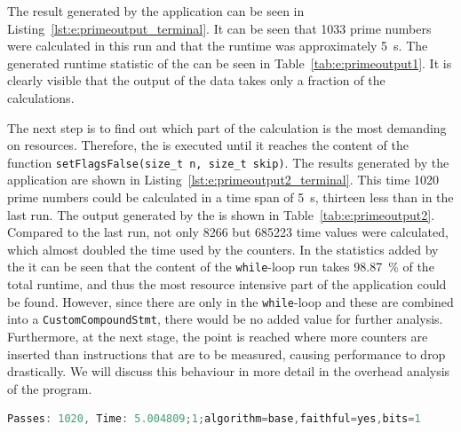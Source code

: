 The result generated by the \PRIME application can be seen in Listing~\ref{lst:e:primeoutput_terminal}. It can be seen that 1033 prime numbers were calculated in this run and that the runtime was approximately \SI{5}{\second}. The generated runtime statistic of the \TOOL can be seen in Table~\ref{tab:e:primeoutput1}. It is clearly visible that the output of the data takes only a fraction of the calculations. 

The next step is to find out which part of the calculation is the most demanding on resources. Therefore, the \TOOL is executed until it reaches the content of the function \lstinline{setFlagsFalse(size_t n, size_t skip)}. The results generated by the \PRIME application are shown in Listing~\ref{lst:e:primeoutput2_terminal}. This time 1020 prime numbers could be calculated in a time span of \SI{5}{\second}, thirteen less than in the last run. The output generated by the \TOOL is shown in Table~\ref{tab:e:primeoutput2}. Compared to the last run, not only 8266 but 685223 time values were calculated, which almost doubled the time used by the counters. In the statistics added by the \TOOL it can be seen that the content of the \lstinline{while}-loop run takes \SI{98.87}{\percent} of the total runtime, and thus the most resource intensive part of the application could be found. However, since there are only \LEASTAS in the \lstinline{while}-loop and these are combined into a \lstinline{CustomCompoundStmt}, there would be no added value for further analysis. Furthermore, at the next stage, the point is reached where more counters are inserted than instructions that are to be measured, causing performance to drop drastically. We will discuss this behaviour in more detail in the overhead analysis of the \PRIME program. 

\begin{lstlisting}[float, language=C++, caption={[Output for the \lstinline{CXXMCall} of the \PRIME Application.]Output for the \lstinline{CXXMemberCallExpr} of the \PRIME Application.}, label=lst:e:primeoutput2_terminal]
Passes: 1020, Time: 5.004809;1;algorithm=base,faithful=yes,bits=1
\end{lstlisting}

